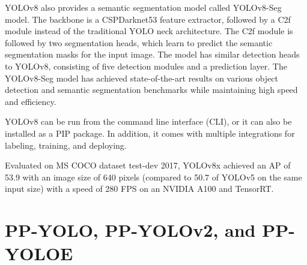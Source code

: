 \documentclass{article}
\begin{document}
YOLOv8 also provides a semantic segmentation model called YOLOv8-Seg model. The backbone is a CSPDarknet53 feature extractor, followed by a C2f module instead of the traditional YOLO neck architecture. The C2f module is followed by two segmentation heads, which learn to predict the semantic segmentation masks for the input image. The model has similar detection heads to YOLOv8, consisting of five detection modules and a prediction layer. The YOLOv8-Seg model has achieved state-of-the-art results on various object detection and semantic segmentation benchmarks while maintaining high speed and efficiency.

YOLOv8 can be run from the command line interface (CLI), or it can also be installed as a PIP package. In addition, it comes with multiple integrations for labeling, training, and deploying. 

Evaluated on MS COCO dataset test-dev 2017, YOLOv8x achieved an AP of 53.9 with an image size of 640 pixels (compared to 50.7 of YOLOv5 on the same input size) with a speed of 280 FPS on an NVIDIA A100 and TensorRT.



\section{PP-YOLO, PP-YOLOv2, and PP-YOLOE}

\end{document}
